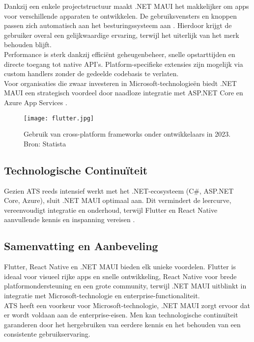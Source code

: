 Dankzij een enkele projectstructuur maakt .NET MAUI het makkelijker om apps voor verschillende apparaten te ontwikkelen. De gebruiksvensters en knoppen passen zich automatisch aan het besturingssysteem aan \autocite{Sheth2024}. Hierdoor krijgt de gebruiker overal een gelijkwaardige ervaring, terwijl het uiterlijk van het merk behouden blijft.\\

Performance is sterk dankzij efficiënt geheugenbeheer, snelle opstarttijden en directe toegang tot native API’s. Platform-specifieke extensies zijn mogelijk via custom handlers zonder de gedeelde codebasis te verlaten.\\

Voor organisaties die zwaar investeren in Microsoft-technologieën biedt .NET MAUI een strategisch voordeel door naadloze integratie met ASP.NET Core en Azure App Services \autocite{Klesman2023}.

\begin{figure}[h]
    \centering
    \texttt{[image: flutter.jpg]}
    \caption{Gebruik van cross-platform frameworks onder ontwikkelaars in 2023. Bron: Statista \autocite{Rodriguez2025}}
    \label{fig:flutter}
\end{figure}

\subsection{Technologische Continuïteit}
Gezien ATS reeds intensief werkt met het .NET-ecosysteem (C#, ASP.NET Core, Azure), sluit .NET MAUI optimaal aan. Dit vermindert de leercurve, vereenvoudigt integratie en onderhoud, terwijl Flutter en React Native aanvullende kennis en inspanning vereisen \autocite{Longe2025}.

\subsection{Samenvatting en Aanbeveling}
Flutter, React Native en .NET MAUI bieden elk unieke voordelen. Flutter is ideaal voor visueel rijke apps en snelle ontwikkeling, React Native voor brede platformondersteuning en een grote community, terwijl .NET MAUI uitblinkt in integratie met Microsoft-technologie en enterprise-functionaliteit.\\


ATS heeft een voorkeur voor Microsoft-technologie, .NET MAUI zorgt ervoor dat er wordt voldaan aan de enterprise-eisen. Men kan technologische continuïteit garanderen door het hergebruiken van eerdere kennis en het behouden van een consistente gebruikservaring. 

